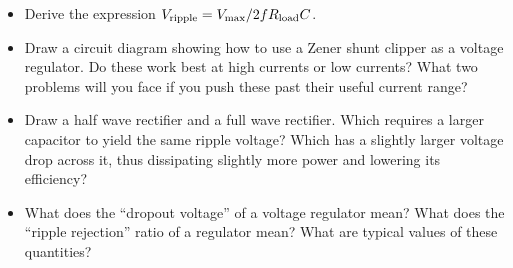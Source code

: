 \begin{itemize}

\item Derive the expression $V_{\rm ripple}=V_{\rm max}/2fR_{\rm load} C$.

\item Draw a circuit diagram showing how to use a Zener shunt clipper as a voltage regulator.  Do these work best at high currents or low currents?  What two problems will you face if you push these past their useful current range?

\item Draw a half wave rectifier and a full wave rectifier.  Which requires a larger capacitor to yield the same ripple voltage?  Which has a slightly larger voltage drop across it, thus dissipating slightly more power and lowering its efficiency?

\item What does the ``dropout voltage'' of a voltage regulator mean?  What does the ``ripple rejection'' ratio of a regulator mean?  What are typical values of these quantities? 

\end{itemize}






